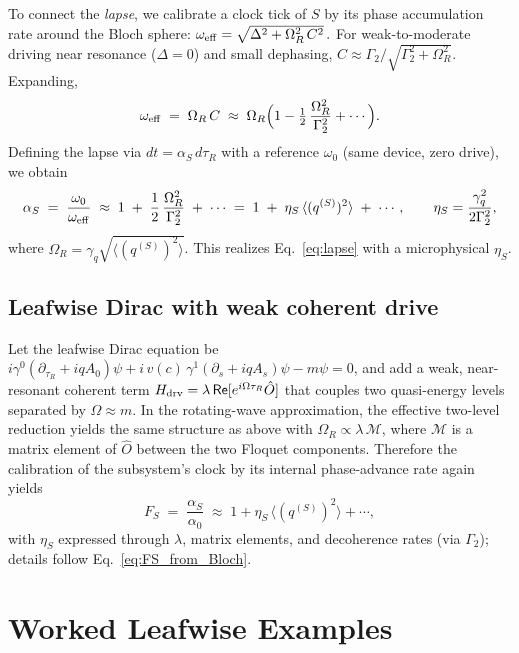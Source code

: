 \documentclass[11pt]{article}
\begin{document}
To connect the \emph{lapse}, we calibrate a clock tick of \(S\) by its phase accumulation rate around the Bloch sphere:
\(
\omega_{\rm eff}=\sqrt{\Delta^2+\Omega_R^2\,C^2}\,.
\)
For weak-to-moderate driving near resonance (\(\Delta=0\)) and small dephasing, \(C\approx \Gamma_2/\sqrt{\Gamma_2^2+\Omega_R^2}\).
Expanding,
\[
\omega_{\rm eff} \;=\; \Omega_R\,C \;\approx\; \Omega_R\Big(1 - \tfrac12\,\frac{\Omega_R^2}{\Gamma_2^2} + \cdots\Big).
\]
Defining the lapse via \(dt=\alpha_S\,d\tau_R\) with a reference \(\omega_0\) (same device, zero drive), we obtain
\begin{equation}
\alpha_S \;=\; \frac{\omega_0}{\omega_{\rm eff}}
\;\approx\; 1 \;+\; \frac{1}{2}\,\frac{\Omega_R^2}{\Gamma_2^2} \;+\; \cdots 
\;=\; 1 \;+\; \eta_S\,\langle (q^{(S)})^2\rangle \;+\; \cdots,
\qquad 
\eta_S=\frac{\gamma_q^2}{2\Gamma_2^2},
\label{eq:FS_from_Bloch}
\end{equation}
where \(\Omega_R=\gamma_q \sqrt{\langle (q^{(S)})^2\rangle}\). This realizes Eq.~\eqref{eq:lapse} with a microphysical \(\eta_S\).

\subsection{Leafwise Dirac with weak coherent drive}
Let the leafwise Dirac equation be 
\(
i\gamma^0(\partial_{\tau_R}+iqA_0)\psi+i\,v(c)\,\gamma^1(\partial_s+iqA_s)\psi - m\psi = 0
\),
and add a weak, near-resonant coherent term \(H_{\rm drv}=\lambda\,\mathsf{Re}[e^{i\Omega\tau_R} \hat{O}]\) that couples two quasi-energy levels separated by \(\Omega\approx m\).
In the rotating-wave approximation, the effective two-level reduction yields the same structure as above with \(\Omega_R\propto \lambda\,\mathcal{M}\), where \(\mathcal{M}\) is a matrix element of \(\hat{O}\) between the two Floquet components.
Therefore the calibration of the subsystem’s clock by its internal phase-advance rate again yields
\[
F_S \;=\; \frac{\alpha_S}{\alpha_0} \;\approx\; 1 + \eta_S\,\langle (q^{(S)})^2\rangle + \cdots,
\]
with \(\eta_S\) expressed through \(\lambda\), matrix elements, and decoherence rates (via \(\Gamma_2\)); details follow Eq.~\eqref{eq:FS_from_Bloch}.


\section{Worked Leafwise Examples}
\end{document}
